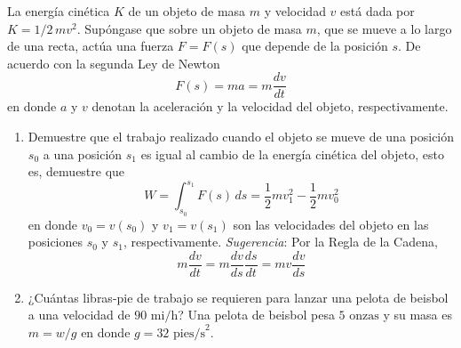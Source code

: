 \item La energía cinética $K$ de un objeto de masa $m$ y velocidad $v$ está dada por $K = 1/2 \, mv^2$. Supóngase que sobre un objeto de masa $m$, que se mueve a lo largo de una recta, actúa una fuerza $F = F(s)$ que depende de la posición $s$. De acuerdo con la segunda Ley de Newton
$$F(s) = ma = m \frac{dv}{dt}$$
en donde $a$ y $v$ denotan la aceleración y la velocidad del objeto, respectivamente.
\begin{enumerate}
    \item[(a)] Demuestre que el trabajo realizado cuando el objeto se mueve de una posición $s_0$ a una posición $s_1$ es igual al cambio de la energía cinética del objeto, esto es, demuestre que
    $$W = \int_{s_0}^{s_1} F(s) \, ds = \frac{1}{2}mv_1^2 - \frac{1}{2}mv_0^2$$
    en donde $v_0 = v(s_0)$ y $v_1 = v(s_1)$ son las velocidades del objeto en las posiciones $s_0$ y $s_1$, respectivamente. \textit{Sugerencia}: Por la Regla de la Cadena,
    $$m \frac{dv}{dt} = m \frac{dv}{ds}\frac{ds}{dt} = mv \frac{dv}{ds}$$
    \item[(b)] ¿Cuántas libras-pie de trabajo se requieren para lanzar una pelota de beisbol a una velocidad de $90 \text{ mi/h}$? Una pelota de beisbol pesa $5 \text{ onzas}$ y su masa es $m = w/g$ en donde $g = 32 \text{ pies/s}^2$.
\end{enumerate}
